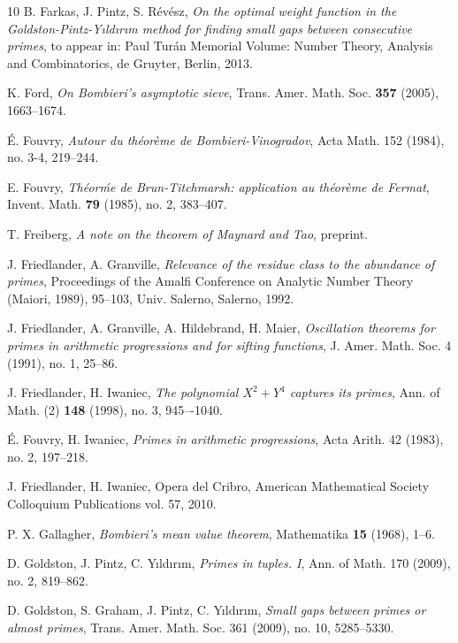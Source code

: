 \documentclass{bmcart}
\theoremstyle{plain}
\theoremstyle{definition}
\begin{document}
\begin{backmatter}
\begin{thebibliography}{10}
 B. Farkas, J. Pintz, S. R\'ev\'esz, \emph{On the
    optimal weight function in the Goldston-Pintz-Y{\i}ld{\i}r{\i}m
    method for finding small gaps between consecutive primes}, to
  appear in: Paul Tur\'an Memorial Volume: Number Theory, Analysis and
  Combinatorics, de Gruyter, Berlin, 2013.

K. Ford, \emph{On Bombieri's asymptotic sieve}, Trans. Amer. Math. Soc. \textbf{357} (2005), 1663--1674.

 \'E. Fouvry, \emph{Autour du th\'eor\`eme de
    Bombieri-Vinogradov}, Acta Math. 152 (1984), no. 3-4,
  219--244.

E. Fouvry, \emph{Th\'eor\'me de Brun-Titchmarsh: application au th\'eor\`eme de Fermat}, Invent. Math. \textbf{79} (1985), no. 2, 383--407.

T. Freiberg, \emph{A note on the theorem of Maynard and Tao}, preprint.

  J. Friedlander, A. Granville, \emph{Relevance of the
     residue class to the abundance of primes}, Proceedings of the
   Amalfi Conference on Analytic Number Theory (Maiori, 1989),
   95--103, Univ. Salerno, Salerno, 1992.

  J. Friedlander, A. Granville, A. Hildebrand, H. Maier,
   \emph{Oscillation theorems for primes in arithmetic progressions
     and for sifting functions}, J. Amer. Math. Soc. 4 (1991), no. 1,
   25--86.

J. Friedlander, H. Iwaniec, \emph{The polynomial $X^2+Y^4$ captures its primes}, Ann. of Math. (2) \textbf{148} (1998), no. 3, 945–-1040.

 \'E. Fouvry, H. Iwaniec, \emph{Primes in arithmetic
    progressions}, Acta Arith. 42 (1983), no. 2, 197--218.
	
J. Friedlander, H. Iwaniec, Opera del Cribro, American Mathematical Society Colloquium Publications vol. 57, 2010.		

P. X. Gallagher, \emph{Bombieri's mean value theorem}, Mathematika \textbf{15} (1968), 1--6.

  D. Goldston, J. Pintz, C. Y{\i}ld{\i}r{\i}m,
   \emph{Primes in tuples. I}, Ann. of Math. 170 (2009),
   no. 2, 819--862.

  D. Goldston, S. Graham, J. Pintz,
   C. Y{\i}ld{\i}r{\i}m, \emph{Small gaps between primes or almost
     primes}, Trans. Amer. Math. Soc. 361 (2009), no. 10,
   5285--5330.


\end{thebibliography}
\end{backmatter}
\end{document}
